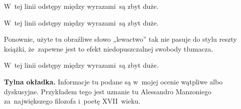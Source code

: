 \documentclass[a4paper,11pt]{article}
\begin{document}
\vspace{\spaceFour}





\noindent
{} W~tej linii odstępy między wyrazami~są zbyt duże.

\vspace{\spaceFour}





\noindent
{} W~tej linii odstępy między wyrazami~są zbyt duże.

\vspace{\spaceFour}





\noindent
{} Ponownie, użyte tu obraźliwe słowo „lewactwo” tak nie pasuje
do stylu reszty książki, że~zapewne jest to efekt niedopuszczalnej swobody
tłumacza.

\vspace{\spaceFour}





\noindent
{} W~tej linii odstępy między wyrazami~są zbyt duże.

\vspace{\spaceFour}





\noindent
\textbf{Tylna okładka.} Informacje tu podane są w~mojej ocenie wątpliwe
albo dyskusyjne. Przykładem tego jest uznanie tu Alessandro Manzoniego
za~największego filozofa i~poetę XVII~wieku.

\vspace{\spaceFour}





\newpage

\end{document}
